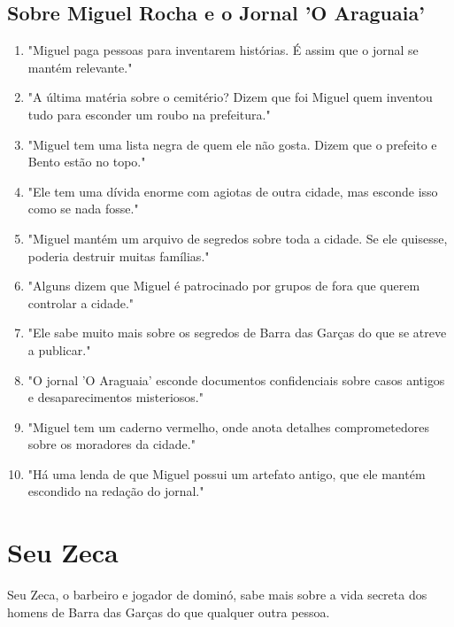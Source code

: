 \subsection*{Sobre Miguel Rocha e o Jornal 'O Araguaia'}
\begin{enumerate}
    \item "Miguel paga pessoas para inventarem histórias. É assim que o jornal se mantém relevante."
    \item "A última matéria sobre o cemitério? Dizem que foi Miguel quem inventou tudo para esconder um roubo na prefeitura."
    \item "Miguel tem uma lista negra de quem ele não gosta. Dizem que o prefeito e Bento estão no topo."
    \item "Ele tem uma dívida enorme com agiotas de outra cidade, mas esconde isso como se nada fosse."
    \item "Miguel mantém um arquivo de segredos sobre toda a cidade. Se ele quisesse, poderia destruir muitas famílias."
    \item "Alguns dizem que Miguel é patrocinado por grupos de fora que querem controlar a cidade."
    \item "Ele sabe muito mais sobre os segredos de Barra das Garças do que se atreve a publicar."
    \item "O jornal 'O Araguaia' esconde documentos confidenciais sobre casos antigos e desaparecimentos misteriosos."
    \item "Miguel tem um caderno vermelho, onde anota detalhes comprometedores sobre os moradores da cidade."
    \item "Há uma lenda de que Miguel possui um artefato antigo, que ele mantém escondido na redação do jornal."
\end{enumerate}

\section{Seu Zeca}
Seu Zeca, o barbeiro e jogador de dominó, sabe mais sobre a vida secreta dos homens de Barra das Garças do que qualquer outra pessoa.

